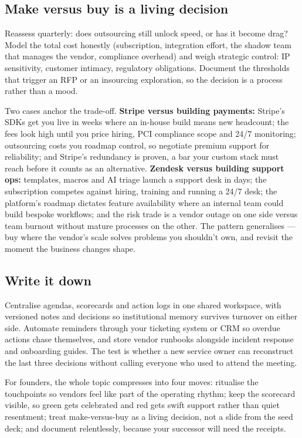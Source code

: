 \subsection{Make versus buy is a living decision}


Reassess quarterly: does outsourcing still unlock speed, or has it become drag? Model the total cost honestly (subscription, integration effort, the shadow team that manages the vendor, compliance overhead) and weigh strategic control: IP sensitivity, customer intimacy, regulatory obligations. Document the thresholds that trigger an RFP or an insourcing exploration, so the decision is a process rather than a mood.


Two cases anchor the trade-off. \textbf{Stripe versus building payments:} Stripe's SDKs get you live in weeks where an in-house build means new headcount; the fees look high until you price hiring, PCI compliance scope and 24/7 monitoring; outsourcing costs you roadmap control, so negotiate premium support for reliability; and Stripe's redundancy is proven, a bar your custom stack must reach before it counts as an alternative. \textbf{Zendesk versus building support ops:} templates, macros and AI triage launch a support desk in days; the subscription competes against hiring, training and running a 24/7 desk; the platform's roadmap dictates feature availability where an internal team could build bespoke workflows; and the risk trade is a vendor outage on one side versus team burnout without mature processes on the other. The pattern generalises — buy where the vendor's scale solves problems you shouldn't own, and revisit the moment the business changes shape.



\subsection{Write it down}


Centralise agendas, scorecards and action logs in one shared workspace, with versioned notes and decisions so institutional memory survives turnover on either side. Automate reminders through your ticketing system or CRM so overdue actions chase themselves, and store vendor runbooks alongside incident response and onboarding guides. The test is whether a new service owner can reconstruct the last three decisions without calling everyone who used to attend the meeting.


For founders, the whole topic compresses into four moves: ritualise the touchpoints so vendors feel like part of the operating rhythm; keep the scorecard visible, so green gets celebrated and red gets swift support rather than quiet resentment; treat make-versus-buy as a living decision, not a slide from the seed deck; and document relentlessly, because your successor will need the receipts.

